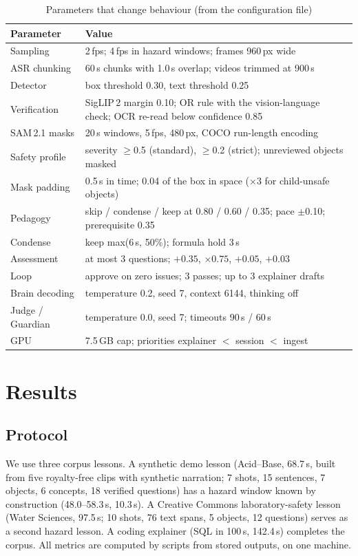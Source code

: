 \documentclass[9pt,a4paper]{extarticle}
\begin{document}
\begin{table}[t]
\caption{Parameters that change behaviour (from the configuration file)}
\label{tab:params}
\centering
\begin{tabular}{|L{3.0cm}|L{10.4cm}|}
\hline
Parameter & Value\\
\hline
Sampling & 2\,fps; 4\,fps in hazard windows; frames 960\,px wide\\
ASR chunking & 60\,s chunks with 1.0\,s overlap; videos trimmed at 900\,s\\
Detector & box threshold 0.30, text threshold 0.25\\
Verification & SigLIP\,2 margin 0.10; OR rule with the vision-language check; OCR re-read below confidence 0.85\\
SAM\,2.1 masks & 20\,s windows, 5\,fps, 480\,px, COCO run-length encoding\\
Safety profile & severity $\geq$0.5 (standard), $\geq$0.2 (strict); unreviewed objects masked\\
Mask padding & 0.5\,s in time; 0.04 of the box in space ($\times$3 for child-unsafe objects)\\
Pedagogy & skip / condense / keep at 0.80 / 0.60 / 0.35; pace $\pm$0.10; prerequisite 0.35\\
Condense & keep max(6\,s, 50\%); formula hold 3\,s\\
Assessment & at most 3 questions; $+0.35$, $\times0.75$, $+0.05$, $+0.03$\\
Loop & approve on zero issues; 3 passes; up to 3 explainer drafts\\
Brain decoding & temperature 0.2, seed 7, context 6144, thinking off\\
Judge / Guardian & temperature 0.0, seed 7; timeouts 90\,s / 60\,s\\
GPU & 7.5\,GB cap; priorities explainer $<$ session $<$ ingest\\
\hline
\end{tabular}
\end{table}

\section{Results}
\subsection{Protocol}
We use three corpus lessons. A synthetic demo lesson (Acid--Base, 68.7\,s, built from five royalty-free clips with
synthetic narration; 7 shots, 15 sentences, 7 objects, 6 concepts, 18 verified questions) has a hazard window known by
construction (48.0--58.3\,s, 10.3\,s). A Creative Commons laboratory-safety lesson (Water Sciences, 97.5\,s; 10 shots, 76
text spans, 5 objects, 12 questions) serves as a second hazard lesson. A coding explainer (SQL in 100\,s, 142.4\,s)
completes the corpus. All metrics are computed by scripts from stored outputs, on one machine.
\end{document}
